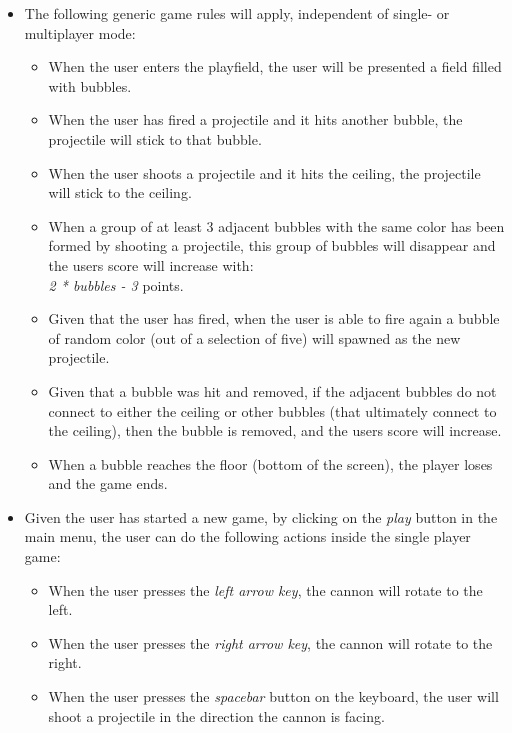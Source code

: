 \documentclass[a4paper,11pt]{article}
\begin{document}
\begin{itemize}
  \item The following generic game rules will apply,
        independent of single- or multiplayer mode:
  \begin{itemize}
    \item When the user enters the playfield,
          the user will be presented a field filled with bubbles.
    \item When the user has fired a projectile and it hits another bubble,
          the projectile will stick to that bubble.
    \item When the user shoots a projectile and it hits the ceiling,
          the projectile will stick to the ceiling.
    \item When a group of at least 3 adjacent bubbles with the same color
          has been formed by shooting a projectile,
          this group of bubbles will disappear and the users score will increase with: \\
          \textit{2 * bubbles - 3} points.
    \item Given that the user has fired,
          when the user is able to fire again a bubble of random color
          (out of a selection of five) will spawned as the new projectile.
    \item Given that a bubble was hit and removed,
          if the adjacent bubbles do not connect to either the ceiling or
          other bubbles (that ultimately connect to the ceiling),
          then the bubble is removed, and the users score will increase.
    \item When a bubble reaches the floor (bottom of the screen),
          the player loses and the game ends.
  \end{itemize}

  \newpage
  \item Given the user has started a new game,
        by clicking on the \textit{play} button in the main menu,
        the user can do the following actions inside the single player game:
  \begin{itemize}
    \item When the user presses the \textit{left arrow key},
          the cannon will rotate to the left.
    \item When the user presses the \textit{right arrow key},
          the cannon will rotate to the right.
    \item When the user presses the \textit{spacebar} button on the keyboard,
          the user will shoot a projectile in the direction the cannon is facing.
  \end{itemize}


\end{itemize}
\end{document}
